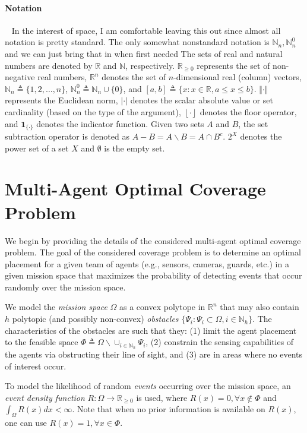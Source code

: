 \documentclass[letterpaper, 10 pt, conference]{ieeeconf}
\newcommand{\R}{\mathbb{R}}
\newcommand{\N}{\mathbb{N}}
\begin{document}
\paragraph*{Notation}\ 
{\color{blue} In the interest of space, I am comfortable leaving this out since almost all notation is pretty standard. The only somewhat nonstandard notation is 
$\mathbb{N}_n, \N_n^0$ and we can just bring that in when first needed
}
The sets of real and natural numbers are denoted by $\R$ and $\N$, respectively. $\R_{\geq 0}$ represents the set of non-negative real numbers, $\R^n$ denotes the set of $n$-dimensional real (column) vectors, $\mathbb{N}_n \triangleq \{1,2,\ldots,n\}$, $\N_n^0 \triangleq \N_n \cup \{0\}$, and $[a,b]\triangleq \{x: x\in\R, a\leq x \leq b\}$. $\Vert \cdot \Vert$ represents the Euclidean norm, $\vert \cdot \vert$ denotes the scalar absolute value or set cardinality (based on the type of the argument), $\left \lfloor{\cdot}\right \rfloor$ denotes the floor operator, and $\mathbf{1}_{\{\cdot\}}$ denotes the indicator function. Given two sets $A$ and $B$, the set subtraction operator is denoted as $A-B = A \backslash B = A\cap B^c$. $2^X$ denotes the power set of a set $X$ and $\emptyset$ is the empty set. 


\section{Multi-Agent Optimal Coverage Problem}
\label{Sec:CoverageProblem}
We begin by providing the details of the considered multi-agent optimal coverage problem. The goal of the considered coverage problem is to determine an optimal placement for a given team of agents (e.g., sensors, cameras, guards, etc.) in a given mission space that maximizes the probability of detecting events that occur randomly over the mission space. 

We model the \emph{mission space} $\Omega$ as a convex polytope in $\R^n$ that may also contain $h$ polytopic (and possibly non-convex) \emph{obstacles} $\{\Psi_i:\Psi_i\subset\Omega, i\in\mathbb{N}_h\}$. The characteristics of the obstacles are such that they: (1) limit the agent placement to the feasible space $\Phi \triangleq \Omega \backslash \cup_{i\in\N_h} \Psi_i$, (2) constrain the sensing capabilities of the agents via obstructing their line of sight, and (3) are in areas where no events of interest occur. 

To model the likelihood of random \emph{events} occurring over the mission space, an \emph{event density function} $R:\Omega \rightarrow \R_{\geq0}$ is used, where $R(x) = 0, \forall x \not\in \Phi$ and $\int_\Omega R(x)dx <\infty$. Note that when no prior information is available on $R(x)$, one can use $R(x)=1, \forall x\in \Phi$. 
\end{document}
